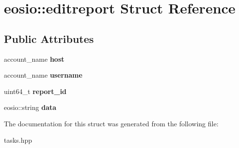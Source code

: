 \hypertarget{structeosio_1_1editreport}{}\section{eosio\+:\+:editreport Struct Reference}
\label{structeosio_1_1editreport}
\subsection*{Public Attributes}
\begin{DoxyCompactItemize}
\item 
\mbox{\label{structeosio_1_1editreport_a3caa7a7533ac466b27bc11c72be1f2bc}} 
account\+\_\+name {\bfseries host}
\item 
\mbox{\label{structeosio_1_1editreport_aaf154493f59d8c18e585d65f19e341c7}} 
account\+\_\+name {\bfseries username}
\item 
\mbox{\label{structeosio_1_1editreport_af2affdc5026cfa20c4ed96b683297a47}} 
uint64\+\_\+t {\bfseries report\+\_\+id}
\item 
\mbox{\label{structeosio_1_1editreport_a9851f6fdc86adcf7dacc9f6068d750a8}} 
eosio\+::string {\bfseries data}
\end{DoxyCompactItemize}


The documentation for this struct was generated from the following file\+:\begin{DoxyCompactItemize}
\item 
tasks.\+hpp\end{DoxyCompactItemize}
